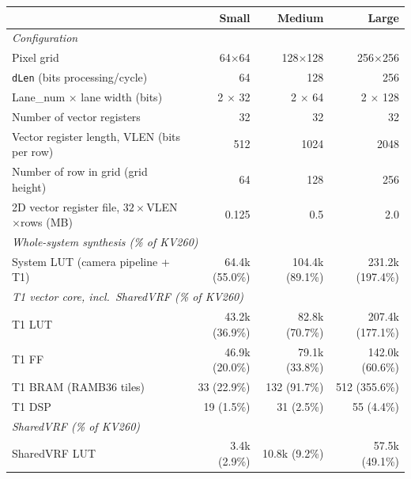 \documentclass[11pt]{article}
\begin{document}
\begin{table}[t]
  \centering
  \small
  \setlength{\tabcolsep}{6pt}
  \begin{tabular}{l rrr}
    \toprule
    & \textbf{Small} & \textbf{Medium} & \textbf{Large} \\
    \midrule
    \multicolumn{4}{l}{\textit{Configuration}}\\
    Pixel grid                            & 64$\times$64    & 128$\times$128  & 256$\times$256  \\
    \texttt{dLen} (bits processing/cycle) & 64              & 128             & 256             \\
    Lane\_num $\times$ lane width (bits)  & 2 $\times$ 32   & 2 $\times$ 64   & 2 $\times$ 128  \\
    Number of vector registers            & 32              & 32              & 32              \\
    Vector register length, VLEN (bits per row) & 512       & 1024            & 2048            \\
    Number of row in grid (grid height)   & 64              & 128             & 256             \\
    2D vector register file, $32{\times}$VLEN$\times$rows (MB) & 0.125 & 0.5   & 2.0             \\ %
    \midrule
    \multicolumn{4}{l}{\textit{Whole-system synthesis (\% of KV260)}}\\
    System LUT (camera pipeline + T1)     & 64.4k (55.0\%)  & 104.4k (89.1\%) & 231.2k (197.4\%) \\ %
    \midrule
    \multicolumn{4}{l}{\textit{T1 vector core, incl.\ SharedVRF (\% of KV260)}}\\
    T1 LUT                                & 43.2k (36.9\%)  & 82.8k (70.7\%)  & 207.4k (177.1\%) \\ %
    T1 FF                                 & 46.9k (20.0\%)  & 79.1k (33.8\%)  & 142.0k (60.6\%)  \\ %
    T1 BRAM (RAMB36 tiles)                & 33 (22.9\%)     & 132 (91.7\%)    & 512 (355.6\%)    \\
    T1 DSP                                & 19 (1.5\%)      & 31 (2.5\%)      & 55 (4.4\%)       \\
    \midrule
    \multicolumn{4}{l}{\textit{SharedVRF (\% of KV260)}}\\
    SharedVRF LUT                         & 3.4k (2.9\%)    & 10.8k (9.2\%)   & 57.5k (49.1\%)   \\ %

\end{tabular}
\end{table}
\end{document}
